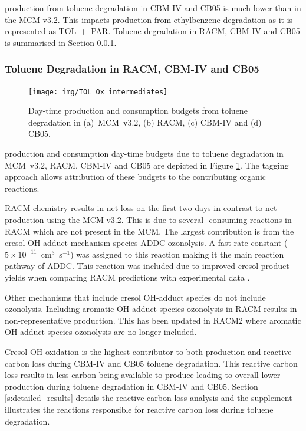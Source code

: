  production from toluene degradation in CBM-IV and CB05 is much lower than in the MCM v3.2.
This impacts  production from ethylbenzene degradation as it is represented as \mbox{TOL + PAR}. 
Toluene degradation in RACM, CBM-IV and CB05 is summarised in Section \ref{sss:aromatic}.  

\subsubsection{Toluene Degradation in RACM, CBM-IV and CB05} \label{sss:aromatic}

\begin{figure}
    \centering
    \texttt{[image: img/TOL\_Ox\_intermediates]}
    \vspace{0mm}
    \caption{Day-time  production and consumption budgets from toluene degradation in \mbox{(a) MCM v3.2}, (b) RACM, (c) CBM-IV and (d) CB05.}
    \vspace{-4mm}
    \label{f:toluene_Ox}
\end{figure}

 production and consumption day-time budgets due to toluene degradation in \mbox{MCM v3.2}, RACM, CBM-IV and CB05 are depicted in Figure \ref{f:toluene_Ox}. 
The tagging approach allows attribution of these budgets to the contributing organic reactions.

RACM chemistry results in net  loss on the first two days in contrast to net  production using the MCM v3.2.
This is due to several -consuming reactions in RACM which are not present in the MCM.
The largest contribution is from the cresol OH-adduct mechanism species ADDC ozonolysis.
A fast rate constant \mbox{($5 \times 10^{-11}$ cm$^3$ s$^{-1}$)} was assigned to this reaction making it the main reaction pathway of ADDC. 
This reaction was included due to improved cresol product yields when comparing RACM predictions with experimental data \citep{Stockwell:1997}.

Other mechanisms that include cresol OH-adduct species do not include ozonolysis.
Including aromatic OH-adduct species ozonolysis in RACM results in non-representative  production. 
This has been updated in RACM2 where aromatic OH-adduct species ozonolysis are no longer included.

Cresol OH-oxidation is the highest contributor to both  production and reactive carbon loss during CBM-IV and CB05 toluene degradation.
This reactive carbon loss results in less carbon being available to produce  leading to overall lower  production during toluene degradation in CBM-IV and CB05.
Section \ref{s:detailed_results} details the reactive carbon loss analysis and the supplement illustrates the reactions responsible for reactive carbon loss during toluene degradation.

